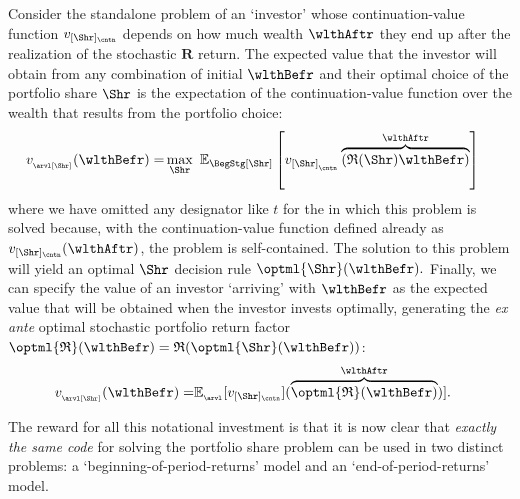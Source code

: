\documentclass[titlepage, headings=optiontotocandhead]{econtex}
\begin{document}
Consider the standalone problem of an `investor' whose continuation-value function $v_{[\Shr]_\cntn}$ depends on how much wealth $\wlthAftr$ they end up after the realization of the stochastic ${\mathbf{R}}$ return.  The expected value that the investor will obtain from any combination of initial $\wlthBefr$ and their optimal choice of the portfolio share $\Shr$ is the expectation of the continuation-value function over the wealth that results from the portfolio choice:
\begin{equation}\begin{gathered}\begin{aligned}
  v_{_\arvl[\Shr]}(\wlthBefr)  = & \max_{\Shr}~ {\mathbb{E}}_{\BegStg[\Shr]}\left[v_{[\Shr]_{_\cntn}}\overbrace{\left(\mathfrak{R}(\Shr){\wlthBefr}\right)}^{\wlthAftr}\right] \label{eq:vMidStgShr}
    \end{aligned}\end{gathered}\end{equation}
where we have omitted any {\interval} designator like $t$ for the {\interval} in which this problem is solved because, with the continuation-value function defined already as $v_{[\Shr]_\cntn}(\wlthAftr)$, the problem is self-contained.  The solution to this problem will yield an optimal $\Shr$ decision rule $\optml{\Shr}(\wlthBefr).$  Finally, we can specify the value of an investor `arriving' with $\wlthBefr$ as the expected value that will be obtained when the investor invests optimally, generating the \textit{ex ante} optimal stochastic portfolio return factor $\optml{\mathfrak{R}}(\wlthBefr)=\mathfrak{R}(\optml{\Shr}(\wlthBefr))$:
\begin{equation}\begin{gathered}\begin{aligned}
      v_{_\arvl[\Shr]}(\wlthBefr)  = & {\mathbb{E}}_{_\arvl}[v_{[\Shr]_\cntn}](\overbrace{\optml{\mathfrak{R}}(\wlthBefr)}^{\wlthAftr})].
\end{aligned}\end{gathered}\end{equation}

The reward for all this notational investment is that it is now clear that \emph{exactly the same code} for solving the portfolio share problem can be used in two distinct problems: a `beginning-of-period-returns' model and an `end-of-period-returns' model.

\hypertarget{beginning-returns}{}
\end{document}
